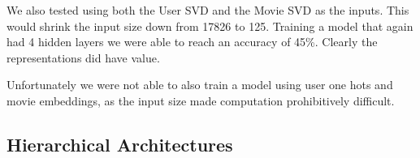 We also tested using both the User SVD and the Movie SVD as the inputs. This would shrink the input size down from 17826 to 125. Training a model that again had 4 hidden layers we were able to reach an accuracy of 45\%. Clearly the representations did have value.

Unfortunately we were not able to also train a model using user one hots and movie embeddings, as the input size made computation prohibitively difficult. 



\subsection{Hierarchical Architectures}
